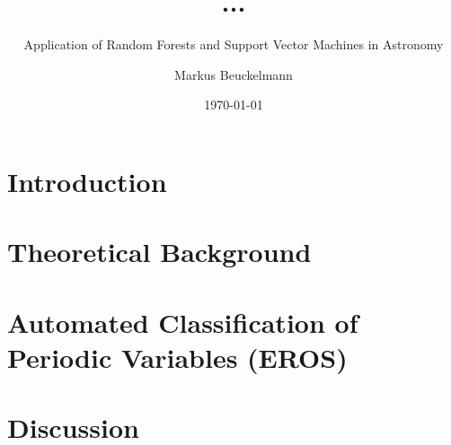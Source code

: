

\title{...}
\subtitle{Application of Random Forests and Support Vector Machines in Astronomy}

\author{Markus Beuckelmann}
\date{\today}






\label{sec:abstract}

\tableofcontents

\newpage

\chapter{Introduction}
\label{sec:introduction}


\chapter{Theoretical Background}
\label{sec:theory}


\chapter{Automated Classification of Periodic Variables (EROS)}
\label{sec:main}


\chapter{Discussion}
\label{sec:discussion}


\cleardoublepage
{}
\listoffigures







\label{sec:declaration}


